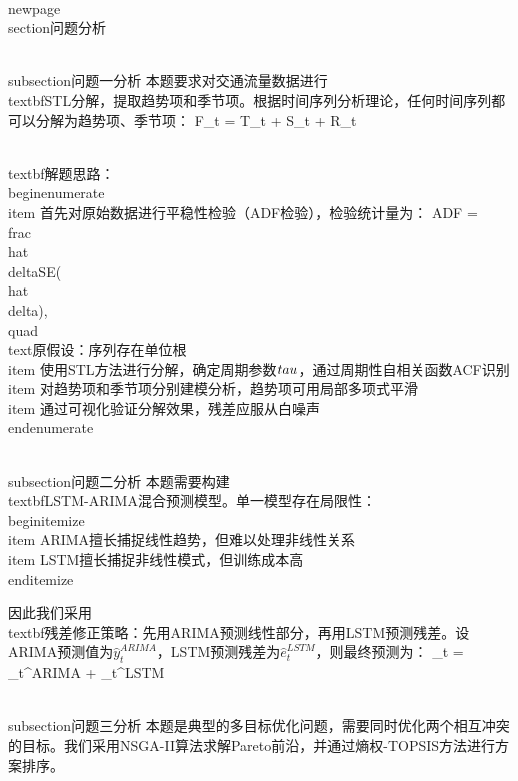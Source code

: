 \\newpage
\\section{问题分析}

\\subsection{问题一分析}
本题要求对交通流量数据进行\\textbf{STL分解}，提取趋势项和季节项。根据时间序列分析理论，任何时间序列都可以分解为趋势项$、季节项$：
F_t = T_t + S_t + R_t

\\textbf{解题思路}：
\\begin{enumerate}
    \\item 首先对原始数据进行平稳性检验（ADF检验），检验统计量为：
    ADF = \\frac{\\hat{\\delta}}{SE(\\hat{\\delta})}, \\quad \\text{原假设：序列存在单位根}
    \\item 使用STL方法进行分解，确定周期参数$\\tau$，通过周期性自相关函数ACF识别
    \\item 对趋势项和季节项分别建模分析，趋势项可用局部多项式平滑
    \\item 通过可视化验证分解效果，残差应服从白噪声
\\end{enumerate}

\\subsection{问题二分析}
本题需要构建\\textbf{LSTM-ARIMA混合预测模型}。单一模型存在局限性：
\\begin{itemize}
    \\item ARIMA擅长捕捉线性趋势，但难以处理非线性关系
    \\item LSTM擅长捕捉非线性模式，但训练成本高
\\end{itemize}

因此我们采用\\textbf{残差修正策略}：先用ARIMA预测线性部分，再用LSTM预测残差。设ARIMA预测值为$\hat{y}_t^{ARIMA}$，LSTM预测残差为$\hat{e}_t^{LSTM}$，则最终预测为：
_t = _t^{ARIMA} + _t^{LSTM}

\\subsection{问题三分析}
本题是典型的多目标优化问题，需要同时优化两个相互冲突的目标。我们采用NSGA-II算法求解Pareto前沿，并通过熵权-TOPSIS方法进行方案排序。